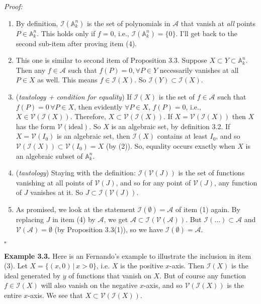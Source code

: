 \documentclass[12pt]{article}
\begin{document}
\noindent \textit{Proof:} 
\begin{enumerate}
	\item By definition, $\mathcal{I}(\mathcal{\mathbb{A}}^n_k)$ is the set of polynomials in $\mathcal{A}$ that vanish at \textit{all} points $P \in \mathbb{A}^n_k$. This holds only if $f = 0$, i.e., $\mathcal{I}(\mathbb{A}^n_k) = \{0\}$. I'll get back to the second sub-item after proving item (4). 
	\item This one is similar to second item of Proposition 3.3. Suppose $X \subset Y \subset \mathbb{A}^n_k$. Then any $f\in \mathcal{A}$ such that $f(P) = 0, \forall P \in Y$ necessarily vanishes at all $P \in X$ as well. This means $f \in \mathcal{I}(X)$. So $\mathcal{I}(Y) \subset \mathcal{I}(X)$.
	\item (\textit{tautology + condition for equality}) If $\mathcal{I}(X)$ is the set of $f \in \mathcal{A}$ such that $f(P) = 0\, \forall P \in X$, then evidently $\forall P \in X$, $f(P) = 0$, i.e., $X \in \mathcal{V}(\mathcal{I}(X))$. Therefore, $X \subset \mathcal{V}(\mathcal{I}(X))$. If $X = \mathcal{V}(\mathcal{I}(X))$ then $X$ has the form $\mathcal{V}(\text{ideal})$. So $X$ is an algebraic set, by definition 3.2. If $X = \mathcal{V}(I_0)$ is an algebraic set, then $\mathcal{I}(X)$ contains at least $I_0$, and so $\mathcal{V}(\mathcal{I}(X)) \subset \mathcal{V}(I_0) = X$ (by (2)). So, equality occurs exactly when $X$ is an algebraic subset of $\mathbb{A}^n_k$. 
	\item (\textit{tautology}) Staying with the definition: $\mathcal{I}(\mathcal{V}(J))$ is the set of functions vanishing at all points of $\mathcal{V}(J)$, and so for any point of $\mathcal{V}(J)$, any function of $J$ vanishes at it. So $J \subset \mathcal{I}(\mathcal{V}(J))$. 
	\item As promised, we look at the statement $\mathcal{I}(\emptyset) = \mathcal{A}$ of item (1) again. By replacing $J$ in item (4) by $\mathcal{A}$, we get $\mathcal{A} \subset \mathcal{I}(\mathcal{V}(\mathcal{A}))$. But $\mathcal{I}(\dots) \subset \mathcal{A}$ and $\mathcal{V}(\mathcal{A}) = \emptyset$ (by Proposition 3.3(1)), so we have $\mathcal{I}(\emptyset) = \mathcal{A}$.   
\end{enumerate}
\hfill $\square$


\noindent \hrulefill




\noindent \textbf{Example 3.3.}
Here is an Fernando's example to illustrate the inclusion in item (3). Let $X = \{ (x,0) \, \vert\, x >0 \}$, i.e. $X$ is the positive $x$-axis. Then $\mathcal{I}(X)$ is the ideal generated by $y$ of functions that vanish on $X$. But of course any function $f \in \mathcal{I}(X)$ will also vanish on the negative $x$-axis, and so $\mathcal{V}(\mathcal{I}(X))$ is the entire $x$-axis. We see that $X \subset \mathcal{V}(\mathcal{I}(X))$.    
\end{document}
